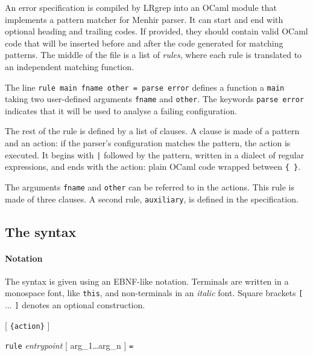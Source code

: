 \documentclass{article}
\begin{document}
An error specification is compiled by LRgrep into an OCaml module that implements a pattern matcher for Menhir parser.
It can start and end with optional heading and trailing codes. If provided, they should contain valid OCaml code that will be inserted before and after the code generated for matching patterns. The middle of the file is a list of {\em rules}, where each rule is translated to an independent matching function.

The line \verb|rule main fname other = parse error| defines a function a \verb|main| taking two user-defined arguments \verb|fname| and \verb|other|. The keywords \verb|parse error| indicates that it will be used to analyse a failing configuration.

The rest of the rule is defined by a list of clauses. A clause is made of a pattern and an action: if the parser's configuration matches the pattern, the action is executed. It begins with \texttt{|} followed by the pattern, written in a dialect of regular expressions, and ends with the action: plain OCaml code wrapped between \texttt{\{ \}}.

The arguments \verb|fname| and \verb|other| can be referred to in the actions. This rule is made of three clauses. A second rule, \verb|auxiliary|, is defined in the specification.

\subsection{The syntax}

\paragraph{Notation}

The syntax is given using an EBNF-like notation. 
Terminals are written in a monospace font, like \texttt{this}, and non-terminals in an \textit{italic} font.
Square brackets \verb|[| ... \verb|]| denotes an optional construction. 

\let\t\texttt
\let\nt\textit

[ \t{\{action\}} ]

\t{rule} \nt{entrypoint} [ arg_1\ldots arg_n ] \t{=}
\nt{}
\end{document}
